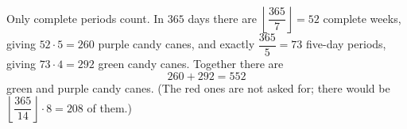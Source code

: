 Only complete periods count. In $365$ days there are $\left\lfloor\dfrac{365}{7}\right\rfloor=52$ complete weeks, giving $52\cdot5=260$ purple candy canes, and exactly $\dfrac{365}{5}=73$ five-day periods, giving $73\cdot4=292$ green candy canes. Together there are
\[260+292=\boxed{552}\]
green and purple candy canes. (The red ones are not asked for; there would be $\left\lfloor\dfrac{365}{14}\right\rfloor\cdot8=208$ of them.)
